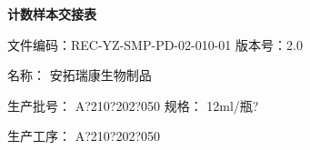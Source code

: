\documentclass[UTF8,10pt,a4paper,fontset=fandol]{ctexart}
\newcommand{\fieldvalue}[1]{#1}
\newcommand{\handwritten}[1]{#1}
\begin{document}
\newpage

\begin{center}
\textbf{计数样本交接表}
\end{center}

\noindent
文件编码：REC-YZ-SMP-PD-02-010-01 \qquad 版本号：2.0

\noindent
名称：
\fieldvalue{\handwritten{安拓瑞康生物制品}}

\noindent
生产批号：
\fieldvalue{\handwritten{A?210?202?050}}
\qquad
规格：
\fieldvalue{\handwritten{12ml/瓶?}}

\noindent
生产工序：
\fieldvalue{\handwritten{A?210?202?050}}

\vspace{2mm}
\end{document}
